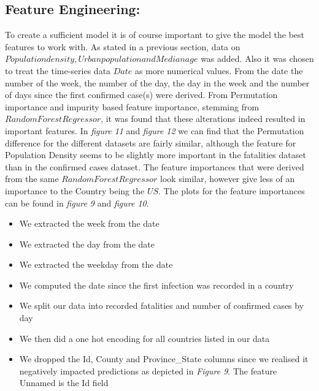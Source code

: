 \documentclass{article}
\begin{document}
\subsection{Feature Engineering:}

To create a sufficient model it is of course important to give the model the best features to work with. As stated in a previous section, data on $Population density, Urban population and Median age$ was added. Also  it was chosen to treat the time-series data $Date$ as more numerical values. From the date the number of the week, the number of the day, the day in the week and the number of days since the first confirmed case(s) were derived. 
From Permutation importance and impurity based feature importance, stemming from $Random Forest Regressor$, it was found that these alterations indeed resulted in important features. In \emph{figure 11} and \emph{figure 12} we can find that the Permutation difference for the different datasets are fairly similar, although the feature for Population Density seems to be slightly more important in the fatalities dataset than in the confirmed cases dataset. 
The feature importances that were derived from the same $Random Forest Regressor$ look similar, however give less of an importance to the Country being the $US$. The plots for the feature importances can be found in \emph{figure 9} and \emph{figure 10}.

\begin{itemize}
\item We extracted the week from the date
\item We extracted the day from the date
\item We extracted the weekday from the date
\item We computed the date since the first infection was recorded in a country
\item We split our data into recorded fatalities and number of confirmed cases by day
\item We then did a one hot encoding for all countries listed in our data
\item We dropped the Id, County and Province\_State columns since we realised it negatively impacted predictions as depicted in \emph{Figure 9}. The feature Unnamed is the Id field
\end{itemize}
\end{document}
